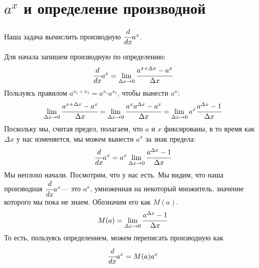 ﻿\documentclass[a4paper,12pt, 3in, 4in]{article}
\begin{document}
    \section*{$a^x$ и определение производной}
    Наша задача вычислить производную $\cfrac{d}{dx}a^x$. \par
    Для начала запишем производную по определению:
    \[
        \cfrac{d}{dx} a^x = \lim\limits_{\Delta x \to 0}\cfrac{a^{x + \Delta x} - a^{x}}{\Delta x}
    \]
    Пользуясь правилом $a^{x_1+x_2} = a^{x_1}a^{x_2}$, чтобы вынести $a^x$:
    \[ 
        \lim\limits_{\Delta x \to 0}\cfrac{a^{x + \Delta x} - a^{x}}{\Delta x} = \lim\limits_{\Delta x \to 0}\cfrac{a^xa^{\Delta x} - a^x}{\Delta x} = \lim\limits_{\Delta x \to 0}a^x\cfrac{a^{\Delta x} - 1}{\Delta x}
    \]
    Поскольку мы, считая предел, полагаем, что $a$ и $x$ фиксированы, в то время как $\Delta x$ у нас изменяется, мы можем вынести $a^x$ за знак предела: 
    \[
        \cfrac{d}{dx} a^x = a^x\lim\limits_{\Delta x\to 0}\cfrac{a^{\Delta x} - 1}{\Delta x}
    \]
    Мы неплохо начали. Посмотрим, что у нас есть. Мы видим, что наша производная $\cfrac{d}{dx} a^x$--- это $a^x$, умноженная на некоторый множитель, значение которого мы пока не знаем. Обозначим его как $M(a)$. 
    \[
        M(a) = \lim\limits_{\Delta x \to 0}\cfrac{a^{\Delta x} - 1}{\Delta x}
    \]
    То есть, пользуясь определением, можем переписать производную как
    \[
        \cfrac{d}{dx}a^x  = M(a)a^x
    \]
\end{document}
